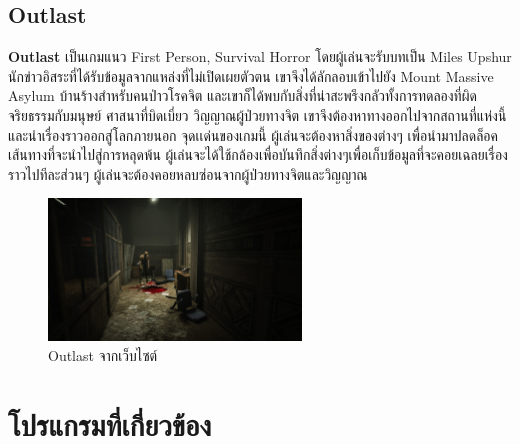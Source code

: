 \subsection{Outlast}
\subsubitem \textbf{Outlast} \cite{outlast:theory} เป็นเกมแนว First Person, Survival Horror โดยผู้เล่นจะรับบทเป็น Miles Upshur นักข่าวอิสระที่ได้รับข้อมูลจากแหล่งที่ไม่เปิดเผยตัวตน เขาจึงได้ลักลอบเข้าไปยัง Mount Massive Asylum บ้านร้างสำหรับคนป่าวโรคจิต และเขาก็ได้พบกับสิ่งที่น่าสะพรึงกลัวทั้งการทดลองที่ผิดจริยธรรมกับมนุษย์ ศาสนาที่บิดเบี่ยว วิญญาณผู้ป่วยทางจิต เขาจึงต้องหาทางออกไปจากสถานที่แห่งนี้ และนำเรื่องราวออกสู่โลกภายนอก จุดเเด่นของเกมนี้ ผู้เล่นจะต้องหาสิ่งของต่างๆ เพื่อนำมาปลดล็อคเส้นทางที่จะนำไปสู่การหลุดพ้น ผู้เล่นจะได้ใช้กล้องเพื่อบันทึกสิ่งต่างๆเพื่อเก็บข้อมูลที่จะคอยเฉลยเรื่องราวไปทีละส่วนๆ ผู้เล่นจะต้องคอยหลบซ่อนจากผู้ป่วยทางจิตและวิญญาณ 
\begin{figure}[h]
  \centering
  \includegraphics[width=0.6\textwidth, height=0.2\textheight]{Images/OutlastScreenShot-04-1920x1080.jpg}
  \caption{Outlast จากเว็บไซต์}\label{OutlastScreenShot}
\end{figure}


\section{โปรแกรมที่เกี่ยวข้อง}

